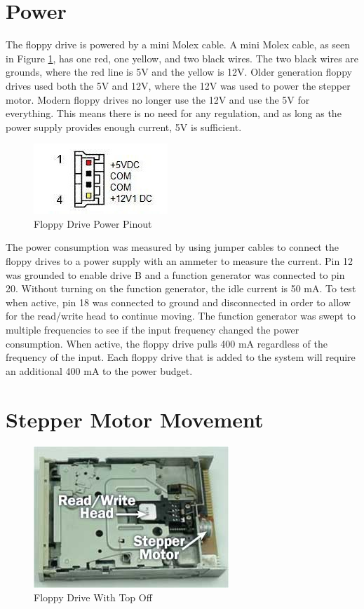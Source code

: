 \documentclass[11pt, a4paper]{report}
\begin{document}
\section{Power}\label{POWER}

The floppy drive is powered by a mini Molex cable. A mini Molex cable, as seen in Figure \ref{fig:miniMolex}, has one red, one yellow, and two black wires. The two black wires are grounds, where the red line is 5V and the yellow is 12V. Older generation floppy drives used both the 5V and 12V, where the 12V was used to power the stepper motor. Modern floppy drives no longer use the 12V and use the 5V for everything. This means there is no need for any regulation, and as long as the power supply provides enough current, 5V is sufficient. 

\begin{figure}[H]
\hspace*{-2cm}    
    \centering
    \includegraphics[width=.4\textwidth]{miniMolex.jpg}
    \caption{Floppy Drive Power Pinout}
    \label{fig:miniMolex}
\end{figure}

The power consumption was measured by using jumper cables to connect the floppy drives to a power supply with an ammeter to measure the current. Pin 12 was grounded to enable drive B and a function generator was connected to pin 20. Without turning on the function generator, the idle current is 50 mA. To test when active, pin 18 was connected to ground and disconnected in order to allow for the read/write head to continue moving. The function generator was swept to multiple frequencies to see if the input frequency changed the power consumption. When active, the floppy drive pulls 400 mA regardless of the frequency of the input. Each floppy drive that is added to the system will require an additional 400 mA to the power budget. \\

\section{Stepper Motor Movement}

\begin{figure}[H]
\hspace*{-2cm}    
    \centering
    \includegraphics[width=.5\textwidth]{floppydrive_coveroff.jpg}
    \caption{Floppy Drive With Top Off}
    \label{fig:coveroff}
\end{figure}
\end{document}
